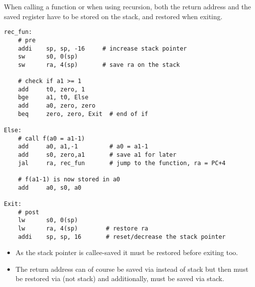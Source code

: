 When calling a function or when using recursion, both the return address  and the saved register  have to be stored on the stack, and restored when exiting.
\begin{lstlisting}[language={[RISC-V]Assembler}]
rec_fun:
    # pre
    addi    sp, sp, -16     # increase stack pointer
    sw      s0, 0(sp)
    sw      ra, 4(sp)       # save ra on the stack

    # check if a1 >= 1
    add     t0, zero, 1
    bge     a1, t0, Else
    add     a0, zero, zero
    beq     zero, zero, Exit  # end of if

Else:
    # call f(a0 = a1-1)
    add     a0, a1,-1         # a0 = a1-1
    add     s0, zero,a1       # save a1 for later
    jal     ra, rec_fun       # jump to the function, ra = PC+4

    # f(a1-1) is now stored in a0
    add     a0, s0, a0

Exit:
    # post
    lw      s0, 0(sp)       
    lw      ra, 4(sp)        # restore ra
    addi    sp, sp, 16       # reset/decrease the stack pointer

\end{lstlisting}
\begin{itemize}
    \item As the stack pointer is callee-saved it must be restored before exiting too.
    \item The return address  can of course be saved via  instead of stack but then  must be restored via  (not stack) and additionally,  must be saved via stack.
\end{itemize}


